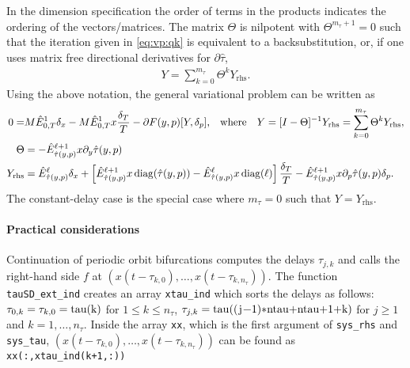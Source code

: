 \documentclass[11pt]{scrartcl}
\DeclareMathOperator{\diag}{diag}
\newcommand{\mlvar}[1]{\lstinline[keywordstyle=\color{var}]!#1!}
\newcommand{\blist}[1]{\mbox{\lstinline!#1!}}
\begin{document}
In the dimension specification the order of terms in the products
indicates the ordering of the vectors/matrices. The matrix $\Theta$ is
nilpotent with $\Theta^{m_\tau+1}=0$ such that the iteration given in
\eqref{eq:vp:qk} is equivalent to a backsubstitution, or, if one uses
matrix free directional derivatives for $\partial\hat{\tau}$,
\begin{align*}
  Y=\sum_{k=0}^{m_\tau}\Theta^kY_\mathrm{rhs}.
\end{align*}
Using the above notation, the general variational problem can be written as
\begin{align}\allowdisplaybreaks
  0=&M\hat{E}^1_{0,T}\delta_x-M\hat{E}^1_{0,T}x\frac{\delta_T}{T}-\partial F(y,p)[Y,\delta_p]\label{eq:genvp}
  \mbox{,\quad where\quad}Y=[I-\Theta]^{-1}Y_\mathrm{rhs}=\sum_{k=0}^{m_\tau}\Theta^kY_\mathrm{rhs},\\
  \label{eq:genvp:lin:mat}  
  \Theta&=-\hat{E}^{\ell+1}_{\hat{\tau}(y,p)}x\partial_y\hat{\tau}(y,p)\\
  \label{eq:genvp:lin:rhs}  
  Y_\mathrm{rhs}&=\hat{E}^\ell_{\hat{\tau}(y,p)}\delta_x+\left[\hat{E}^{\ell+1}_{\hat{\tau}(y,p)}x\diag(\hat{\tau}(y,p))-\hat{E}^\ell_{\hat{\tau}(y,p)}x\diag(\ell)\right]\frac{\delta_T}{T}-\hat{E}^{\ell+1}_{\hat{\tau}(y,p)}x\partial_p\hat{\tau}(y,p)\delta_p\mbox{.}%
\end{align}
The constant-delay case is the special case where $m_\tau=0$ such that $Y=Y_\mathrm{rhs}$.
\paragraph{Practical considerations} Continuation of periodic orbit
bifurcations computes the delays $\tau_{j,k}$ and calls the right-hand
side $f$ at $(x(t-\tau_{k,0}),\ldots,x(t-\tau_{k,n_\tau}))$. The
function \mlvar{tauSD_ext_ind} creates an array \mlvar{xtau_ind} which
sorts the delays as follows: $\tau_{0,k}=\tau_{k,0}=\blist{tau(k)}$
for $1\leq k\leq n_\tau$,
$\tau_{j,k}=\blist{tau((j-1)*ntau+ntau+1+k)}$ for $j\geq1$ and
$k=1,\ldots,n_\tau$. Inside the array \mlvar{xx}, which is the first
argument of \blist{sys_rhs} and \blist{sys_tau},
$(x(t-\tau_{k,0}),\ldots,x(t-\tau_{k,n_\tau}))$ can be found as
\blist{xx(:,xtau_ind(k+1,:))}
\end{document}
